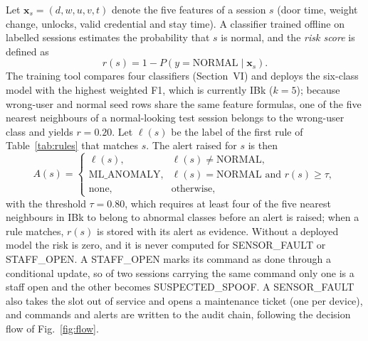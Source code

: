 \documentclass[journal,onecolumn]{IEEEtran}
\begin{document}
Let $\mathbf{x}_s = (d, w, u, v, t)$ denote the five features of a session $s$ (door time, weight change, unlocks,
valid credential and stay time). A classifier trained offline on labelled sessions estimates the probability that $s$
is normal, and the \emph{risk score} is defined as
\begin{equation}
r(s) = 1 - P\left(y = \text{NORMAL} \mid \mathbf{x}_s\right).
\label{eq:risk}
\end{equation}
The training tool compares four classifiers (Section~VI) and deploys the six-class model with the highest weighted F1,
which is currently IBk ($k=5$); because wrong-user and normal seed rows share the same feature formulas, one of the five
nearest neighbours of a normal-looking test session belongs to the wrong-user class and yields $r = 0.20$. Let
$\ell(s)$ be the label of the first rule of Table~\ref{tab:rules} that matches $s$. The alert raised for $s$ is then
\begin{equation}
A(s) =
\begin{cases}
\ell(s), & \ell(s) \neq \text{NORMAL},\\
\text{ML\_ANOMALY}, & \ell(s) = \text{NORMAL} \text{ and } r(s) \geq \tau,\\
\text{none}, & \text{otherwise},
\end{cases}
\label{eq:alert}
\end{equation}
with the threshold $\tau = 0.80$, which requires at least four of the five nearest neighbours in IBk to belong to
abnormal classes before an alert is raised; when a rule matches, $r(s)$ is stored with its alert as evidence. Without a
deployed model the risk is zero, and it is never computed for SENSOR\_FAULT or STAFF\_OPEN. A STAFF\_OPEN marks its
command as done through a conditional update, so of two sessions carrying the same command only one is a staff open and
the other becomes SUSPECTED\_SPOOF. A SENSOR\_FAULT also takes the slot out of service and opens a maintenance ticket
(one per device), and commands and alerts are written to the audit chain, following the decision flow of
Fig.~\ref{fig:flow}.
\end{document}
